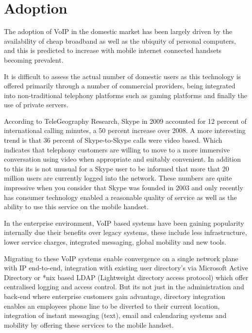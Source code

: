 \section{Adoption}
The adoption of VoIP in the domestic market has been largely driven by the availability of cheap broadband as well as the ubiquity of personal computers, and this is predicted to increase with mobile internet connected handsets becoming prevalent.

It is difficult to assess the actual number of domestic users as this technology is offered primarily through a number of commercial providers, being integrated into non-traditional telephony platforms such as gaming platforms and finally the use of private servers. 

According to TeleGeography Research, Skype in 2009 accounted for 12 percent of international calling minutes, a 50 percent increase over 2008\cite{website:skype_usage}. A more interesting trend is that 36 percent of Skype-to-Skype calls were video based\cite{website:skype_usage}. Which indicates that telephony customers are willing to move to a more immersive conversation using video when appropriate and suitably convenient. In addition to this its is not unusual for a Skype user to be informed that more that 20 million users are currently logged into the network. These numbers are quite impressive when you consider that Skype was founded in 2003 and only recently has consumer technology enabled a reasonable quality of service as well as the ability to use this service on the mobile handset.

In the enterprise environment, VoIP based systems have been gaining popularity internally due their benefits over legacy systems, these include less infrastructure, lower service charges, integrated messaging, global mobility and new tools\cite{website:windows_networking_voip_enterprise}.

Migrating to these VoIP systems enable convergence on a single network plane with IP end-to-end, integration with existing user directory's via Microsoft Active Directory or *nix based LDAP (Lightweight directory access protocol) which offer centralised logging and access control. But its not just in the administration and back-end where enterprise customers gain advantage, directory integration enables an employees phone line to be diverted to their current location, integration of instant messaging (text), email and calendaring systems and mobility by offering these services to the mobile handset.

